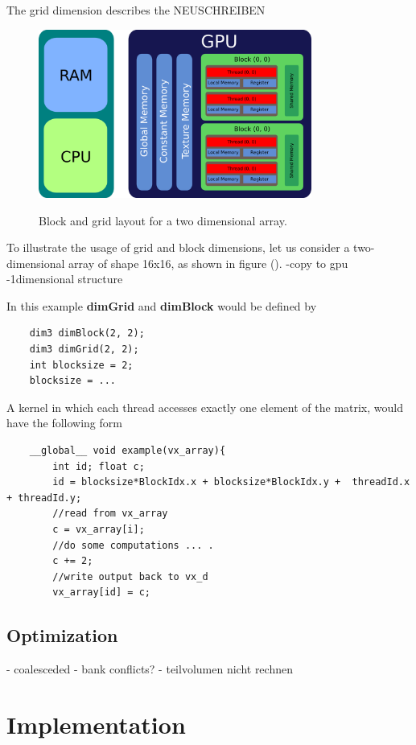 The grid dimension describes the
NEUSCHREIBEN

\begin{figure}[!tbp]
  \centering
  \includegraphics[width=0.8\textwidth]{gfx/cuda/gpu.png}\label{fig:gpu_grid}
  \caption{Block and grid layout for a two dimensional array.}
\end{figure}

To illustrate the usage of grid and block dimensions, let us consider a two-dimensional array of shape 16x16, as shown in figure ().
-copy to gpu
-1dimensional structure

In this example \textbf{dimGrid} and \textbf{dimBlock} would be defined by
\begin{verbatim}
    dim3 dimBlock(2, 2);
    dim3 dimGrid(2, 2);
    int blocksize = 2;
    blocksize = ...
\end{verbatim}

A kernel in which each thread accesses exactly one element of the matrix, would have the following form

\begin{verbatim}
    __global__ void example(vx_array){
        int id; float c;
        id = blocksize*BlockIdx.x + blocksize*BlockIdx.y +  threadId.x + threadId.y;
        //read from vx_array
        c = vx_array[i];
        //do some computations ... .
        c += 2;
        //write output back to vx_d
        vx_array[id] = c;
\end{verbatim}

\subsection{Optimization}
- coalesceded
- bank conflicts?
- teilvolumen nicht rechnen
\newpage

\section{Implementation}

